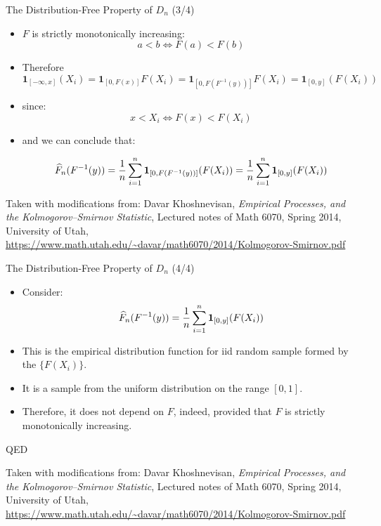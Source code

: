 \documentclass{beamer}
\begin{document}
\begin{frame}
{\centerline{The Distribution-Free Property of $D_n$ (3/4)}}

\begin{itemize}

\item  $F$ is strictly monotonically increasing:
$$a < b \Longleftrightarrow F(a) < F(b) $$
\item Therefore 
$$\mathbf {1}_{[-\infty ,x]}(X_{i}) = \mathbf {1}_{[0 ,F(x)]}F(X_{i})  = \mathbf {1}_{[0 ,F(F^{-1}(y))]}F(X_{i})  =  \mathbf {1}_{[0 ,y]}(F(X_{i}))$$
\item since:
$$x < X_{i} \Longleftrightarrow F(x) < F(X_{i}) $$

\item and we can conclude that:

$$ \widehat {F}_{n}(F^{-1}(y))= {1 \over n}\sum _{i=1}^{n}\mathbf {1}_{[0 ,F(F^{-1}(y))]}(F(X_{i})) =  {1 \over n}\sum _{i=1}^{n}\mathbf {1}_{[0 ,y]}(F(X_{i})) $$
\end{itemize}

\begin{center}
\tiny{Taken with modifications from: Davar Khoshnevisan, \textit{Empirical Processes, and the Kolmogorov–Smirnov Statistic}, Lectured notes of Math 6070, Spring 2014, University of Utah, \url{https://www.math.utah.edu/~davar/math6070/2014/Kolmogorov-Smirnov.pdf}}
\end{center}

\end{frame}



\begin{frame}
{\centerline{The Distribution-Free Property of $D_n$ (4/4)}}

\begin{itemize}
\item Consider:
$$   \widehat {F}_{n}(F^{-1}(y)) = {1 \over n}\sum _{i=1}^{n}\mathbf {1}_{[0 ,y]}(F(X_{i})) $$
\item This is the empirical distribution function for iid random sample formed by the $\{F(X_{i})\}$. 
\item It is a sample from the uniform distribution on the range $[0, 1]$.
\item Therefore, it does not depend on $F$, indeed, provided that $F$ is strictly monotonically increasing. 
\end{itemize}
QED


\begin{center}
\tiny{Taken with modifications from: Davar Khoshnevisan, \textit{Empirical Processes, and the Kolmogorov–Smirnov Statistic}, Lectured notes of Math 6070, Spring 2014, University of Utah, \url{https://www.math.utah.edu/~davar/math6070/2014/Kolmogorov-Smirnov.pdf}}
\end{center}

\end{frame}
\end{document}
